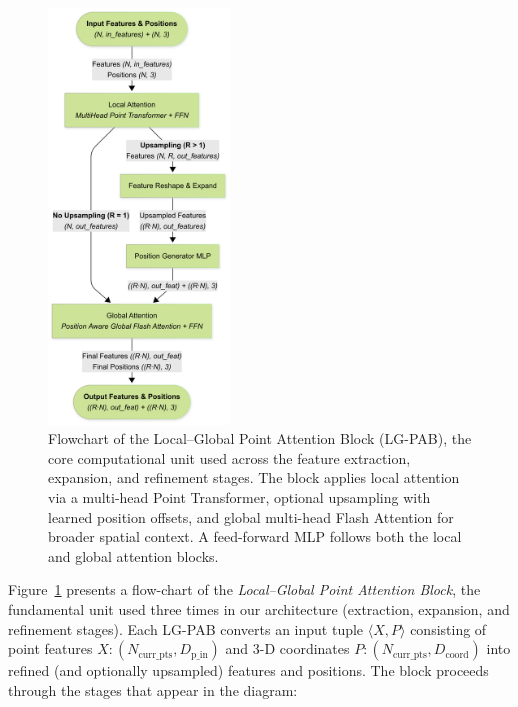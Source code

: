 \documentclass[preprints,article,accept,pdftex,moreauthors]{Definitions/mdpi}
\begin{document}
\begin{figure}
  \centering
  \includegraphics[trim=0mm 0mm 36mm 0mm, clip, width=0.43\textwidth]{manuscript/figures/LG-PAB.png}
  \caption{Flowchart of the Local–Global Point Attention Block (LG-PAB), the core computational unit used across the feature extraction, expansion, and refinement stages. The block applies local attention via a multi-head Point Transformer, optional upsampling with learned position offsets, and global multi-head Flash Attention for broader spatial context. A feed-forward MLP follows both the local and global attention blocks.} 
  \label{fig:lgpab}
\end{figure}%

Figure~\ref{fig:lgpab} presents a flow-chart of the \emph{Local–Global Point Attention Block}, the fundamental unit used three times in our architecture (extraction, expansion, and refinement stages).  
Each LG-PAB converts an input tuple $\langle X, P \rangle$ consisting of point features $X: (N_{\text{curr\_pts}}, D_{\text{p\_in}})$ and 3-D coordinates $P: (N_{\text{curr\_pts}}, D_{\text{coord}})$ into refined (and optionally upsampled) features and positions. The block proceeds through the stages that appear in the diagram:
\end{document}
